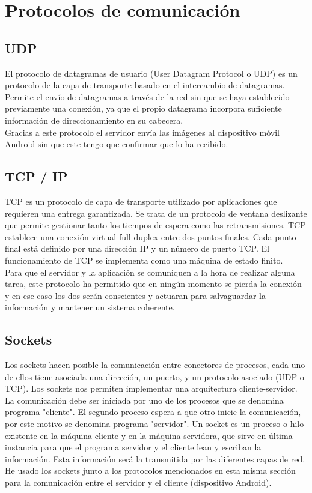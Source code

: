 \section{Protocolos de comunicación}

\subsection{UDP}

El protocolo de datagramas de usuario (User Datagram Protocol o UDP) es un protocolo de la capa de transporte basado en el intercambio de datagramas. Permite el envío de datagramas a través de la red sin que se haya establecido previamente una conexión, ya que el propio datagrama incorpora suficiente información de direccionamiento en su cabecera.\\
Gracias a este protocolo el servidor envía las imágenes al dispositivo móvil Android sin que este tengo que confirmar que lo ha recibido.

\subsection{TCP / IP}

TCP es un protocolo de capa de transporte utilizado por aplicaciones que requieren una entrega garantizada. Se trata de un protocolo de ventana deslizante que permite gestionar tanto los tiempos de espera como las retransmisiones. TCP establece una conexión virtual full duplex entre dos puntos finales. Cada punto final está definido por una dirección IP y un número de puerto TCP. El funcionamiento de TCP se implementa como una máquina de estado finito.\\
Para que el servidor y la aplicación se comuniquen a la hora de realizar alguna tarea, este protocolo ha permitido que en ningún momento se pierda la conexión y en ese caso los dos serán conscientes y actuaran para salvaguardar la información y mantener un sistema coherente.

\subsection{Sockets}

Los sockets hacen posible la comunicación entre conectores de procesos, cada uno de ellos tiene asociada una dirección, un puerto, y un protocolo asociado (UDP o TCP). Los sockets nos permiten implementar una arquitectura cliente-servidor. La comunicación debe ser iniciada por uno de los procesos que se denomina programa "cliente". El segundo proceso espera a que otro inicie la comunicación, por este motivo se denomina programa "servidor". Un socket es un proceso o hilo existente en la máquina cliente y en la máquina servidora, que sirve en última instancia para que el programa servidor y el cliente lean y escriban la información. Esta información será la transmitida por las diferentes capas de red.\\
He usado los sockets junto a los protocolos mencionados en esta misma sección para la comunicación entre el servidor y el cliente (dispositivo Android).



